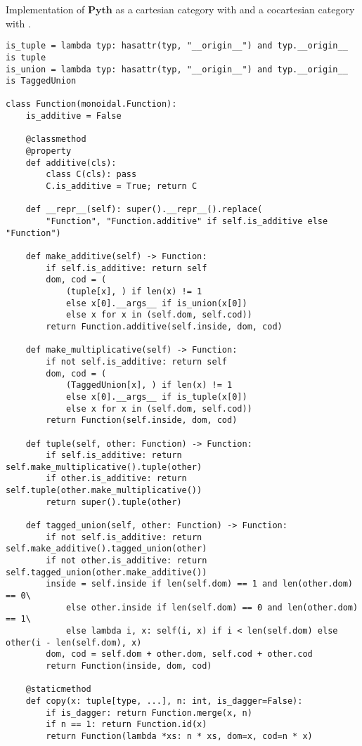 \begin{python}\label{listing:python-co-cartesian}
{\normalfont Implementation of $\mathbf{Pyth}$ as a cartesian category with  and a cocartesian category with .}

\begin{verbatim}
is_tuple = lambda typ: hasattr(typ, "__origin__") and typ.__origin__ is tuple
is_union = lambda typ: hasattr(typ, "__origin__") and typ.__origin__ is TaggedUnion

class Function(monoidal.Function):
    is_additive = False

    @classmethod
    @property
    def additive(cls):
        class C(cls): pass
        C.is_additive = True; return C

    def __repr__(self): super().__repr__().replace(
        "Function", "Function.additive" if self.is_additive else "Function")

    def make_additive(self) -> Function:
        if self.is_additive: return self
        dom, cod = (
            (tuple[x], ) if len(x) != 1
            else x[0].__args__ if is_union(x[0])
            else x for x in (self.dom, self.cod))
        return Function.additive(self.inside, dom, cod)

    def make_multiplicative(self) -> Function:
        if not self.is_additive: return self
        dom, cod = (
            (TaggedUnion[x], ) if len(x) != 1
            else x[0].__args__ if is_tuple(x[0])
            else x for x in (self.dom, self.cod))
        return Function(self.inside, dom, cod)

    def tuple(self, other: Function) -> Function:
        if self.is_additive: return self.make_multiplicative().tuple(other)
        if other.is_additive: return self.tuple(other.make_multiplicative())
        return super().tuple(other)

    def tagged_union(self, other: Function) -> Function:
        if not self.is_additive: return self.make_additive().tagged_union(other)
        if not other.is_additive: return self.tagged_union(other.make_additive())
        inside = self.inside if len(self.dom) == 1 and len(other.dom) == 0\
            else other.inside if len(self.dom) == 0 and len(other.dom) == 1\
            else lambda i, x: self(i, x) if i < len(self.dom) else other(i - len(self.dom), x)
        dom, cod = self.dom + other.dom, self.cod + other.cod
        return Function(inside, dom, cod)

    @staticmethod
    def copy(x: tuple[type, ...], n: int, is_dagger=False):
        if is_dagger: return Function.merge(x, n)
        if n == 1: return Function.id(x)
        return Function(lambda *xs: n * xs, dom=x, cod=n * x)


\end{verbatim}
\end{python}
